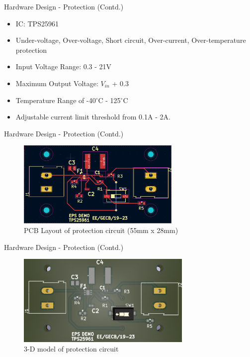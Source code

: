 \documentclass[aspectratio=169]{beamer}
\begin{document}
		\begin{frame}{Hardware Design - Protection (Contd.)}
			\begin{itemize}
				\item IC: TPS25961
				\item Under-voltage, Over-voltage, Short circuit, Over-current, Over-temperature protection	
				\item Input Voltage Range: 0.3 - 21V
				\item Maximum Output Voltage: $V_{in}$ + 0.3
				\item Temperature Range of -40$^{\circ}$C - 125$^{\circ}$C
				\item Adjustable current limit threshold from 0.1A - 2A.
			\end{itemize}
		\end{frame}
		\begin{frame}{Hardware Design - Protection (Contd.) }
			\begin{figure}[h]
				\centering
				\includegraphics[width=0.7\textwidth]{diag/prot_circ_layout2.png}
				\caption{PCB Layout of protection circuit (55mm x 28mm)}
				\label{fig:mesh1}
			\end{figure}
		\end{frame}
		\begin{frame}{Hardware Design - Protection (Contd.) }
			\begin{figure}[h]
				\centering
				\includegraphics[width=0.75\textwidth]{diag/prot_circ_3d.png}
				\caption{3-D model of protection circuit}
				\label{fig:mesh1}
			\end{figure}
		\end{frame}
\end{document}
